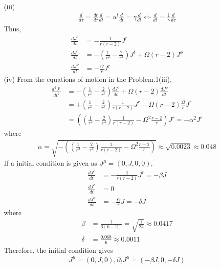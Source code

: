 \documentclass[12pt]{article}
\begin{document}
(iii)
\begin{align}
\frac{d}{d \tau} = \frac{dt}{d \tau} \frac{d}{d t} = u^{t} \frac{d}{d t} = \gamma \frac{d}{d t} \Leftrightarrow \frac{d}{d t} = \frac{1}{\gamma} \frac{d}{d \tau}
\end{align}
Thus,
\begin{align}
\frac{d J^{t}}{d t} &= - \frac{1}{r \left(r - 2\right)} J^{r}\\
\frac{d J^{r}}{d t} &= - \left(\frac{1}{r^2} - \frac{2}{r^3}\right) J^{t} + \Omega \left(r - 2 \right) J^{\phi}\\
\frac{d J^{\phi}}{d t} &= - \frac{\Omega}{r} J^{r}
\end{align}
(iv) From the equations of motion in the Problem.1(iii),
\begin{align}
\frac{d^2 J^{r}}{d t^2} &= - \left(\frac{1}{r^2} - \frac{2}{r^3}\right) \frac{d J^{t}}{d t} + \Omega \left(r - 2 \right) \frac{d J^{\phi}}{d t} \nonumber\\
&= + \left(\frac{1}{r^2} - \frac{2}{r^3}\right) \frac{1}{r \left(r - 2\right)} J^{r} - \Omega \left(r - 2 \right) \frac{\Omega}{r} J^{r} \nonumber\\
&= \left( \left(\frac{1}{r^2} - \frac{2}{r^3}\right) \frac{1}{r \left(r - 2\right)} - \Omega^2 \frac{r - 2}{r} \right) J^{r} = - \alpha^2 J^{r}
\end{align}
where
\begin{align}
\alpha = \sqrt{- \left( \left(\frac{1}{r^2} - \frac{2}{r^3}\right) \frac{1}{r \left(r - 2\right)} - \Omega^2 \frac{r - 2}{r} \right)} \approx \sqrt{0.0023} \approx 0.048
\end{align}
If a initial condition is given as $J^{\mu} = \left(0, J, 0, 0\right)$,
\begin{align}
\frac{d J^{t}}{d t} &= - \frac{1}{r \left(r - 2\right)} J^{r} = - \beta J\\
\frac{d J^{r}}{d t} &= 0\\
\frac{d J^{\phi}}{d t} &= - \frac{\Omega}{r} J = - \delta J
\end{align}
where
\begin{align}
\beta &= \frac{1}{6 \left(6 - 2\right)} = \sqrt{\frac{1}{24}} \approx 0.0417\\
\delta &= \frac{0.068}{6} \approx 0.0011
\end{align}
Therefore, the initial condition gives
\begin{align}
J^{\mu} = \left(0, J, 0\right), \partial_{t} J^{\mu} = \left(- \beta J,0, - \delta J \right)
\end{align}
\end{document}
